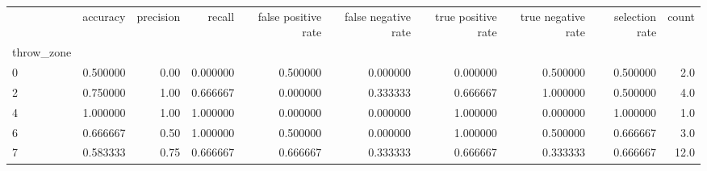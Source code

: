 \begin{tabular}{lrrrrrrrrr}
\toprule
{} &  accuracy &  precision &    recall &  false positive rate &  false negative rate &  true positive rate &  true negative rate &  selection rate &  count \\
throw\_zone &           &            &           &                      &                      &                     &                     &                 &        \\
\midrule
0          &  0.500000 &       0.00 &  0.000000 &             0.500000 &             0.000000 &            0.000000 &            0.500000 &        0.500000 &    2.0 \\
2          &  0.750000 &       1.00 &  0.666667 &             0.000000 &             0.333333 &            0.666667 &            1.000000 &        0.500000 &    4.0 \\
4          &  1.000000 &       1.00 &  1.000000 &             0.000000 &             0.000000 &            1.000000 &            0.000000 &        1.000000 &    1.0 \\
6          &  0.666667 &       0.50 &  1.000000 &             0.500000 &             0.000000 &            1.000000 &            0.500000 &        0.666667 &    3.0 \\
7          &  0.583333 &       0.75 &  0.666667 &             0.666667 &             0.333333 &            0.666667 &            0.333333 &        0.666667 &   12.0 \\
\bottomrule
\end{tabular}
